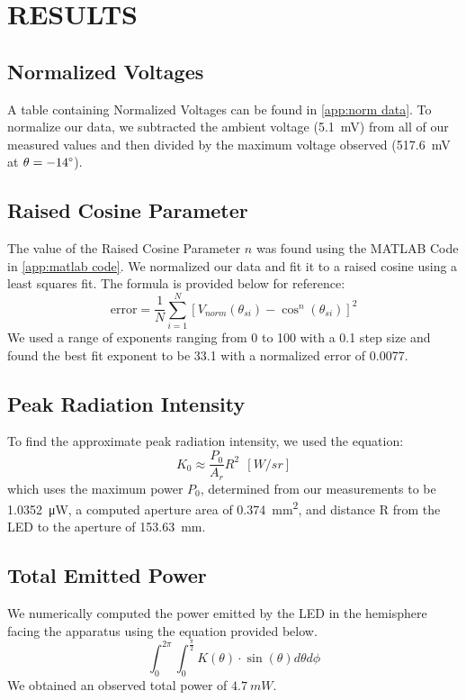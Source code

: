 \section{RESULTS}

\subsection{Normalized Voltages}
A table containing Normalized Voltages can be found in \autoref{app:norm data}. To normalize our data, we subtracted the ambient voltage (\SI{5.1}{\milli\volt}) from all of our measured values and then divided by the maximum voltage observed (\SI{517.6}{\milli\volt} at $\theta = -14\degree$).
\subsection{Raised Cosine Parameter}
The value of the Raised Cosine Parameter $n$ was found using the MATLAB Code in \autoref{app:matlab code}. We normalized our data and fit it to a raised cosine using a least squares fit. The formula is provided below for reference:
\[\text{error} = \frac{1}{N}\sum_{i=1}^{N}[V_{norm}(\theta_{si}) - \cos^{n}(\theta_{si})]^{2}\]
We used a range of exponents ranging from 0 to 100 with a 0.1 step size and found the best fit exponent to be 33.1 with a normalized error of 0.0077.

\subsection{Peak Radiation Intensity}
To find the approximate peak radiation intensity, we used the equation:
\[K_{0}\approx \frac{P_{0}}{A_{r}}R^{2}\: \: [W/sr]\]
which uses the maximum power $P_0$, determined from our measurements to be \SI{1.0352}{\micro\watt}, a computed aperture area of \SI{0.374}{mm^2}, and distance R from the LED to the aperture of \SI{153.63}{mm}. 
\subsection{Total Emitted Power}
We numerically computed the power emitted by the LED in the hemisphere facing the apparatus using the equation provided below.
\[\int_{0}^{2\pi}{\int_{0}^{\frac{\pi}{2}}K(\theta)\cdot \sin(\theta) d \theta d\phi}\]
We obtained an observed total power of $\SI{4.7}{mW}$.

